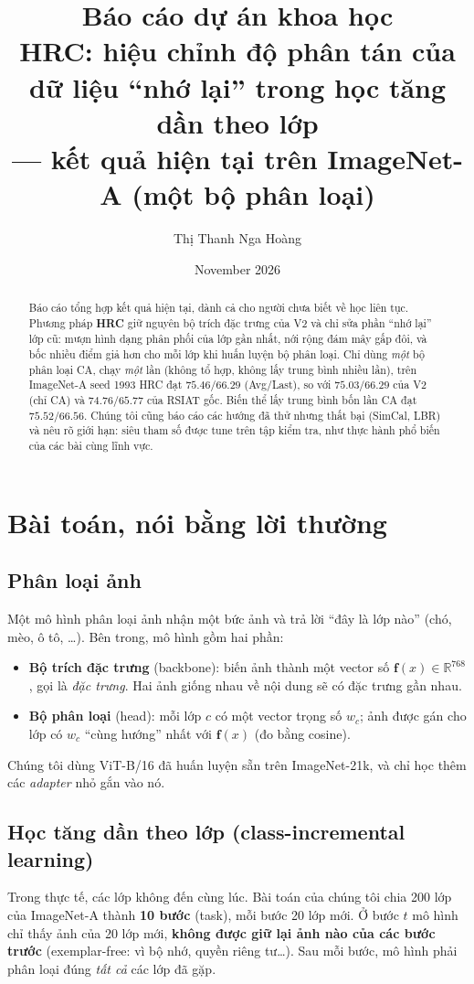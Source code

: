 \documentclass[11pt]{article}
\title{Báo cáo dự án khoa học\\[4pt]
\large HRC: hiệu chỉnh độ phân tán của dữ liệu ``nhớ lại'' trong học tăng dần theo lớp\\
--- kết quả hiện tại trên ImageNet-A (một bộ phân loại)}
\author{Thị Thanh Nga Hoàng}
\date{November 2026}
\newcommand{\R}{\mathbb{R}}
\newcommand{\vf}{\mathbf{f}}
\begin{document}
\maketitle

\begin{abstract}
Báo cáo tổng hợp kết quả hiện tại, dành cả cho người chưa biết về học liên tục. Phương pháp \textbf{HRC} giữ nguyên bộ
trích đặc trưng của V2 và chỉ sửa phần ``nhớ lại'' lớp cũ: mượn hình dạng phân phối của lớp gần nhất, nới rộng đám mây
gấp đôi, và bốc nhiều điểm giả hơn cho mỗi lớp khi huấn luyện bộ phân loại. Chỉ dùng \emph{một} bộ phân loại CA, chạy
\emph{một} lần (không tổ hợp, không lấy trung bình nhiều lần), trên ImageNet-A seed 1993 HRC đạt $\mathbf{75.46/66.29}$
(Avg/Last), so với $75.03/66.29$ của V2 (chỉ CA) và $74.76/65.77$ của RSIAT gốc. Biến thể lấy trung bình bốn lần CA đạt
$75.52/66.56$. Chúng tôi cũng báo cáo các hướng đã thử nhưng thất bại (SimCal, LBR) và nêu rõ giới hạn: siêu tham số
được tune trên tập kiểm tra, như thực hành phổ biến của các bài cùng lĩnh vực.
\end{abstract}

\tableofcontents
\newpage

\section{Bài toán, nói bằng lời thường}

\subsection{Phân loại ảnh}
Một mô hình phân loại ảnh nhận một bức ảnh và trả lời ``đây là lớp nào'' (chó, mèo, ô tô, \dots). Bên trong, mô hình
gồm hai phần:
\begin{itemize}
\item \textbf{Bộ trích đặc trưng} (backbone): biến ảnh thành một vector số $\vf(x)\in\R^{768}$, gọi là \emph{đặc
      trưng}. Hai ảnh giống nhau về nội dung sẽ có đặc trưng gần nhau.
\item \textbf{Bộ phân loại} (head): mỗi lớp $c$ có một vector trọng số $w_c$; ảnh được gán cho lớp có $w_c$ ``cùng
      hướng'' nhất với $\vf(x)$ (đo bằng cosine).
\end{itemize}
Chúng tôi dùng ViT-B/16 đã huấn luyện sẵn trên ImageNet-21k, và chỉ học thêm các \emph{adapter} nhỏ gắn vào nó.

\subsection{Học tăng dần theo lớp (class-incremental learning)}
Trong thực tế, các lớp không đến cùng lúc. Bài toán của chúng tôi chia 200 lớp của ImageNet-A thành \textbf{10 bước}
(task), mỗi bước 20 lớp mới. Ở bước $t$ mô hình chỉ thấy ảnh của 20 lớp mới, \textbf{không được giữ lại ảnh nào của
các bước trước} (exemplar-free: vì bộ nhớ, quyền riêng tư\dots). Sau mỗi bước, mô hình phải phân loại đúng \emph{tất
cả} các lớp đã gặp.
\end{document}
